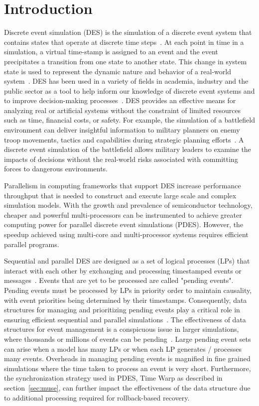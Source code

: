 \section{Introduction}  \label{sec:intro}
	Discrete event simulation (DES) is the simulation of a discrete event system that contains states that operate at discrete time steps~\cite{fishman-13}. At each point in time in a simulation, a virtual time-stamp is assigned to an event and the event precipitates a transition from one state to another state. This change in system state is used to represent the dynamic nature and behavior of a real-world system~\cite{fujimoto-90}. DES has been used in a variety of fields in academia, industry and the public sector as a tool to help inform our knowledge of discrete event systems and to improve decision-making processes~\cite{fishman-13}. DES provides an effective means for analyzing real or artificial systems without the constraint of limited resources such as time, financial costs, or safety. For example, the simulation of a battlefield environment can deliver insightful information to military planners on enemy troop movements, tactics and capabilities during strategic planning efforts~\cite{hill-01}. A discrete event simulation of the battlefield allows military leaders to examine the impacts of decisions without the real-world risks associated with committing forces to dangerous environments. 
    
	Parallelism in computing frameworks that support DES increase performance throughput that is needed to construct and execute large scale and complex simulation models. With the growth and prevalence of semiconductor technology, cheaper and powerful multi-processors can be instrumented to achieve greater computing power for parallel discrete event simulations (PDES). However, the speedup achieved using multi-core and multi-processor systems requires efficient parallel programs. 
    
    Sequential and parallel DES are designed as a set of logical processes (LPs) that interact with each other by exchanging and processing timestamped events or messages~\cite{jafer-13}. Events that are yet to be processed are called "pending events". Pending events must be processed by LPs in priority order to maintain causality, with event priorities being determined by their timestamps. Consequently, data structures for managing and prioritizing pending events play a critical role in ensuring efficient sequential and parallel simulations~\cite{jones-86,ronngren-97,brown-88,franceschini-15}. The effectiveness of data structures for event management is a conspicuous issue in larger simulations, where thousands or millions of events can be pending~\cite{carothers-2010,yeom-14}. Large pending event sets can arise when a model has many LPs or when each LP generates / processes many events. Overheads in managing pending events is magnified in fine grained simulations where the time taken to process an event is very short. Furthermore, the synchronization strategy used in PDES, Time Warp as described in section~\ref{sec:muse}, can further impact the effectiveness of the data structure due to additional processing required for rollback-based recovery.

